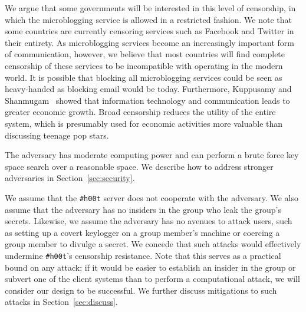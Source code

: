 \documentclass{sig-alternate-arxiv}
\newcommand{\hlfixme}[1]{\fixme{\hl{#1}}}
\newcommand{\hoot}{{\tt \#h00t}\xspace}
\begin{document}
We argue that some governments will be interested in this level of
censorship, in which the microblogging service is allowed in a
restricted fashion. We note that some countries are currently censoring
services such as Facebook and Twitter in their entirety. As
microblogging services become an increasingly important form of
communication, however, we believe that most countries will find
complete censorship of these services to be incompatible with operating
in the modern world. It is possible that blocking all microblogging
services could be seen as heavy-handed as blocking email would be today.
Furthermore, Kuppusamy and Shanmugam~\cite{ict-economy} showed that
information technology and communication leads to greater economic
growth. Broad censorship reduces the utility of the entire system, which
is presumably used for economic activities more valuable than discussing
teenage pop stars.


The adversary has moderate computing power and can perform a brute force
key space search over a reasonable space. We describe
how to address stronger adversaries in Section~\ref{sec:security}.

We assume that the \hoot server does not cooperate with the adversary. We
also assume that the adversary has no insiders in the group who leak the
group's secrets. Likewise, we assume the adversary has no avenues
to attack users, such as setting up a covert keylogger
on a group member's machine or coercing a group
member to divulge a secret. We concede that such attacks would effectively undermine \hoot's censorship
resistance. Note that this serves as a practical bound on any attack; if
it would be easier to establish an insider in the group or subvert one
of the client systems than to perform a computational attack, we will
consider our design to be successful.
We further discuss mitigations to such attacks in Section~\ref{sec:discuss}.
\end{document}
